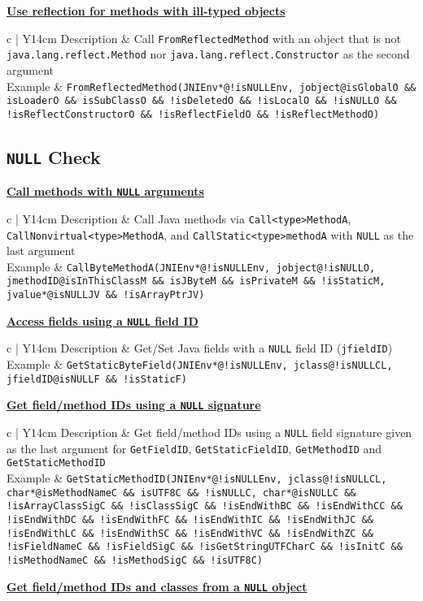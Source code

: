 \documentclass[10pt]{article}
\newcommand{\tc}[1]{\noindent\textbf{\underline{#1}}}
\newcommand{\mytable}[1]{{\renewcommand{\arraystretch}{2.0}
      \begin{tabular}{ c | Y{14cm}} #1
    \end{tabular}}\hfill}
\newcommand{\tctable}[4]{\mytable{#1 & #2 \\\hline #3 & \texttt{#4} \\}}
\begin{document}
\vspace{3mm}
\tc{Use reflection for methods with ill-typed objects}

\tctable
{Description}
{Call {\tt FromReflectedMethod}
with an object that is not {\tt java.lang.reflect.Method} nor {\tt java.lang.reflect.Constructor}
as the second argument}
{Example}
{FromReflectedMethod(JNIEnv*@!isNULLEnv, jobject@isGlobalO \&\& isLoaderO \&\& isSubClassO \&\& !isDeletedO \&\& !isLocalO \&\& !isNULLO \&\& !isReflectConstructorO \&\& !isReflectFieldO \&\& !isReflectMethodO)}

\subsection{{\tt NULL} Check}

\vspace{3mm}
\tc{Call methods with {\tt NULL} arguments}

\tctable
{Description}
{Call Java methods via {\tt Call<type>MethodA}, {\tt CallNonvirtual<type>MethodA}, and
{\tt CallStatic<type>methodA} with {\tt NULL} as the last argument}
{Example}
{CallByteMethodA(JNIEnv*@!isNULLEnv, jobject@!isNULLO, jmethodID@isInThisClassM \&\& isJByteM \&\& isPrivateM \&\& !isStaticM, jvalue*@isNULLJV \&\& !isArrayPtrJV)}

\newpage
\tc{Access fields using a {\tt NULL} field ID}

\tctable
{Description}
{Get/Set Java fields with a {\tt NULL} field ID ({\tt jfieldID})}
{Example}
{GetStaticByteField(JNIEnv*@!isNULLEnv, jclass@!isNULLCL, jfieldID@isNULLF \&\& !isStaticF)}

\vspace{3mm}
\tc{Get field/method IDs using a {\tt NULL} signature}

\tctable
{Description}
{Get field/method IDs using a {\tt NULL} field signature given as the last argument for {\tt GetFieldID}, {\tt GetStaticFieldID}, {\tt GetMethodID} and {\tt GetStaticMethodID}}
{Example}
{GetStaticMethodID(JNIEnv*@!isNULLEnv, jclass@!isNULLCL, char*@isMethodNameC \&\& isUTF8C \&\& !isNULLC, char*@isNULLC \&\& !isArrayClassSigC \&\& !isClassSigC \&\& !isEndWithBC \&\& !isEndWithCC \&\& !isEndWithDC \&\& !isEndWithFC \&\& !isEndWithIC \&\& !isEndWithJC \&\& !isEndWithLC \&\& !isEndWithSC \&\& !isEndWithVC \&\& !isEndWithZC \&\& !isFieldNameC \&\& !isFieldSigC \&\& !isGetStringUTFCharC \&\& !isInitC \&\& !isMethodNameC \&\& !isMethodSigC \&\& !isUTF8C)}

\vspace{3mm}
\tc{Get field/method IDs and classes from a {\tt NULL} object}
\end{document}
